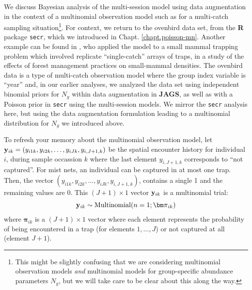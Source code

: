 We discuss Bayesian analysis of the multi-session model using data
augmentation in the context of a multinomial observation model such as
for a multi-catch sampling situation\footnote{This might be slightly
  confusing that we are considering multinomial observation models
  {\it and} multinomial models for group-specific abundance parameters
  $N_{g}$, but we will take care to be clear about this along the
  way.}.  For context, we return to the ovenbird data set, from the
{\bf R} package \mbox{\tt secr}, which we introduced in
Chapt. \ref{chapt.poisson-mn}.  Another example can be found in
\citet{royle_converse:2013}, who applied the model to a small mammal
trapping problem which involved replicate ``single-catch'' arrays of
traps, in a study of the effects of forest management practices on
small-mammal densities.  The ovenbird data is a type of multi-catch
observation model where the group index variable is ``year'' and, in
our earlier analyses, we analyzed the data set using independent
binomial priors for $N_{g}$ within data augmentation in {\bf JAGS}, as
well as with a Poisson prior in \mbox{\tt secr} using the
multi-session models.  We mirror the \mbox{\tt secr} analysis here,
but using the data augmentation formulation leading to a multinomial
distribution for $N_{g}$ we introduced above.


To refresh your memory about the multinomial observation model, let
${\bf y}_{ik} = (y_{i1k}, y_{i2k}, \ldots, y_{iJk}, y_{i,J+1,k})$ be the
spatial encounter history for individual $i$, during sample occassion
$k$ where the last element $y_{i,J+1,k}$ corresponds to ``not
captured''.  For mist nets, an individual can be captured in at most
one trap. Then, the vector
$(y_{i1k},y_{i2k},\ldots,y_{iJk},y_{i,J+1,k})$, contains a single 1
and the remaining values are 0.  This $(J+1)\times 1$ vector ${\bf
  y}_{ik}$ is a multinomial trial:
\[
{\bf y}_{ik} \sim \mbox{Multinomial}(n=1; {\bm \pi}_{ik} )
\]
where ${\bm \pi}_{ik}$ is a $(J+1) \times 1$ vector where each element
represents the probability of being encountered in a trap (for
elements $1,\ldots,J$) or not captured at all (element $J+1$).


